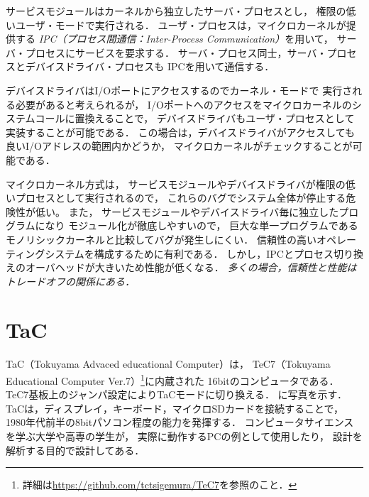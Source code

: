 サービスモジュールはカーネルから独立したサーバ・プロセスとし，
権限の低いユーザ・モードで実行される．
ユーザ・プロセスは，マイクロカーネルが提供する
\emph{IPC（プロセス間通信：Inter-Process Communication）}を用いて，
サーバ・プロセスにサービスを要求する．
サーバ・プロセス同士，サーバ・プロセスとデバイスドライバ・プロセスも
IPCを用いて通信する．

デバイスドライバはI/Oポートにアクセスするのでカーネル・モードで
実行される必要があると考えられるが，
I/Oポートへのアクセスをマイクロカーネルのシステムコールに置換えることで，
デバイスドライバもユーザ・プロセスとして実装することが可能である．
この場合は，デバイスドライバがアクセスしても良いI/Oアドレスの範囲内かどうか，
マイクロカーネルがチェックすることが可能である．

マイクロカーネル方式は，
サービスモジュールやデバイスドライバが権限の低いプロセスとして実行されるので，
これらのバグでシステム全体が停止する危険性が低い。
また，
サービスモジュールやデバイスドライバ毎に独立したプログラムになり
モジュール化が徹底しやすいので，
巨大な単一プログラムであるモノリシックカーネルと比較してバグが発生しにくい．
信頼性の高いオペレーティングシステムを構成するために有利である．
しかし，IPCとプロセス切り換えのオーバヘッドが大きいため性能が低くなる．
\emph{多くの場合，信頼性と性能はトレードオフの関係にある．}

\section{TaC}
TaC（Tokuyama Advaced educational Computer）は，
TeC7（Tokuyama Educational Computer Ver.7）\footnote{
  詳細は\url{https://github.com/tctsigemura/TeC7}を参照のこと．}に内蔵された
16bitのコンピュータである．
TeC7基板上のジャンパ設定によりTaCモードに切り換える．
に写真を示す．
TaCは，ディスプレイ，キーボード，マイクロSDカードを接続することで，
1980年代前半の8bitパソコン程度の能力を発揮する．
コンピュータサイエンスを学ぶ大学や高専の学生が，
実際に動作するPCの例として使用したり，
設計を解析する目的で設計してある．

